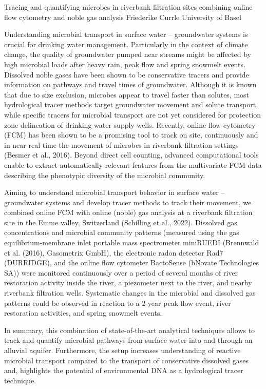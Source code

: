 \begin{conf-abstract}
{Tracing and quantifying microbes in riverbank filtration sites combining online flow cytometry and noble gas analysis}
{Friederike Currle}
{University of Basel}
{Understanding microbial transport in surface water – groundwater systems is crucial for drinking water management. Particularly in the context of climate change, the quality of groundwater pumped near streams might be affected by high microbial loads after heavy rain, peak flow and spring snowmelt events. Dissolved noble gases have been shown to be conservative tracers and provide information on pathways and travel times of groundwater. Although it is known that due to size exclusion, microbes appear to travel faster than solutes, most hydrological tracer methods target groundwater movement and solute transport, while specific tracers for microbial transport are not yet considered for protection zone delineation of drinking water supply wells. Recently, online flow cytometry (FCM) has been shown to be a promising tool to track on site, continuously and in near-real time the movement of microbes in riverbank filtration settings (Besmer et al., 2016). Beyond direct cell counting, advanced computational tools enable to extract automatically relevant features from the multivariate FCM data describing the phenotypic diversity of the microbial community.

Aiming to understand microbial transport behavior in surface water – groundwater systems and develop tracer methods to track their movement, we combined online FCM with online (noble) gas analysis at a riverbank filtration site in the Emme valley, Switzerland (Schilling et al., 2022). Dissolved gas concentrations and microbial community patterns (measured using the gas equilibrium-membrane inlet portable mass spectrometer miniRUEDI (Brennwald et al. (2016), Gasometrix GmbH), the electronic radon detector Rad7 (DURRIDGE), and the online flow cytometer BactoSense (bNovate Technologies SA)) were monitored continuously over a period of several months of river restoration activity inside the river, a piezometer next to the river, and nearby riverbank filtration wells. Systematic changes in the microbial and dissolved gas patterns could be observed in reaction to a 2-year peak flow event, river restoration activities, and spring snowmelt events.

In summary, this combination of state-of-the-art analytical techniques allows to track and quantify microbial pathways from surface water into and through an alluvial aquifer. Furthermore, the setup increases understanding of reactive microbial transport compared to the transport of conservative dissolved gases and, highlights the potential of environmental DNA as a hydrological tracer technique.}
\end{conf-abstract}
